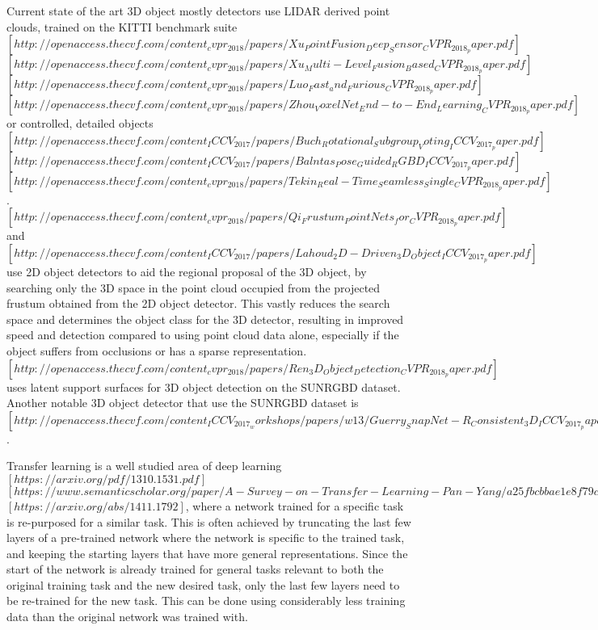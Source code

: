 \documentclass[11pt]{article}
\begin{document}
Current state of the art 3D object mostly detectors use LIDAR derived point clouds, trained on the KITTI benchmark suite $[http://openaccess.thecvf.com/content_cvpr_2018/papers/Xu_PointFusion_Deep_Sensor_CVPR_2018_paper.pdf]$$[http://openaccess.thecvf.com/content_cvpr_2018/papers/Xu_Multi-Level_Fusion_Based_CVPR_2018_paper.pdf]$$[http://openaccess.thecvf.com/content_cvpr_2018/papers/Luo_Fast_and_Furious_CVPR_2018_paper.pdf]$$[http://openaccess.thecvf.com/content_cvpr_2018/papers/Zhou_VoxelNet_End-to-End_Learning_CVPR_2018_paper.pdf]$ or controlled, detailed objects $[http://openaccess.thecvf.com/content_ICCV_2017/papers/Buch_Rotational_Subgroup_Voting_ICCV_2017_paper.pdf]$$[http://openaccess.thecvf.com/content_ICCV_2017/papers/Balntas_Pose_Guided_RGBD_ICCV_2017_paper.pdf]$$[http://openaccess.thecvf.com/content_cvpr_2018/papers/Tekin_Real-Time_Seamless_Single_CVPR_2018_paper.pdf]$. $[http://openaccess.thecvf.com/content_cvpr_2018/papers/Qi_Frustum_PointNets_for_CVPR_2018_paper.pdf]$ and $[http://openaccess.thecvf.com/content_ICCV_2017/papers/Lahoud_2D-Driven_3D_Object_ICCV_2017_paper.pdf]$ use 2D object detectors to aid the regional proposal of the 3D object, by searching only the 3D space in the point cloud occupied from the projected frustum obtained from the 2D object detector. This vastly reduces the search space and determines the object class for the 3D detector, resulting in improved speed and detection compared to using point cloud data alone, especially if the object suffers from occlusions or has a sparse representation. $[http://openaccess.thecvf.com/content_cvpr_2018/papers/Ren_3D_Object_Detection_CVPR_2018_paper.pdf]$ uses latent support surfaces for 3D object detection on the SUNRGBD dataset. Another notable 3D object detector that use the SUNRGBD dataset is $[http://openaccess.thecvf.com/content_ICCV_2017_workshops/papers/w13/Guerry_SnapNet-R_Consistent_3D_ICCV_2017_paper.pdf]$. 

Transfer learning is a well studied area of deep learning $[https://arxiv.org/pdf/1310.1531.pdf]$$[https://www.semanticscholar.org/paper/A-Survey-on-Transfer-Learning-Pan-Yang/a25fbcbbae1e8f79c4360d26aa11a3abf1a11972]$$[https://arxiv.org/abs/1411.1792]$, where a network trained for a specific task is re-purposed for a similar task. This is often achieved by truncating the last few layers of a pre-trained network where the network is specific to the trained task, and keeping the starting layers that have more general representations. Since the start of the network is already trained for general tasks relevant to both the original training task and the new desired task, only the last few layers need to be re-trained for the new task. This can be done using considerably less training data than the original network was trained with.
\end{document}
